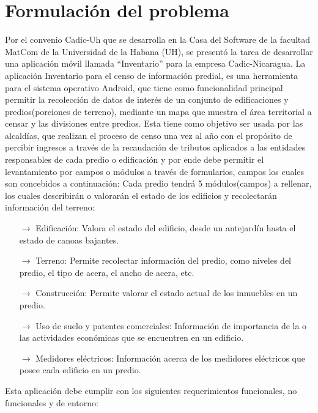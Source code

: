 \section{Formulación del problema}
Por el convenio Cadic-Uh que se desarrolla en la Casa del Software de la facultad
MatCom de la Universidad de la Habana (UH), se presentó la tarea de desarrollar
una aplicación móvil llamada “Inventario” para la empresa Cadic-Nicaragua.
La aplicación Inventario para el censo de información predial, es una herramienta
para el sistema operativo Android, que tiene como funcionalidad principal permitir la
recolección de datos de interés de un conjunto de edificaciones y predios(porciones
de terreno), mediante un mapa que muestra el área territorial a censar y las
divisiones entre predios. Esta tiene como objetivo ser usada por las alcaldías, que
realizan el proceso de censo una vez al año con el propósito de percibir ingresos a
través de la recaudación de tributos aplicados a las entidades responsables de cada
predio o edificación y por ende debe permitir el levantamiento por campos o
módulos a través de formularios, campos los cuales son concebidos a continuación:
Cada predio tendrá 5 módulos(campos) a rellenar, los cuales describirán o valorarán
el estado de los edificios y recolectarán información del terreno:
\begin{itemize}
    \item[$\rightarrow$] Edificación: Valora el estado del edificio, desde un antejardín hasta el
          estado de canoas bajantes.
    \item[$\rightarrow$] Terreno: Permite recolectar información del predio, como niveles del predio,
          el tipo de acera, el ancho de acera, etc.
    \item[$\rightarrow$] Construcción: Permite valorar el estado actual de los inmuebles en un
          predio.
    \item[$\rightarrow$] Uso de suelo y patentes comerciales: Información de importancia de la o
          las actividades económicas que se encuentren en un edificio.
    \item[$\rightarrow$] Medidores eléctricos: Información acerca de los medidores eléctricos que
          posee cada edificio en un predio.
\end{itemize}
Esta aplicación debe cumplir con los siguientes requerimientos funcionales, no
funcionales y de entorno:
